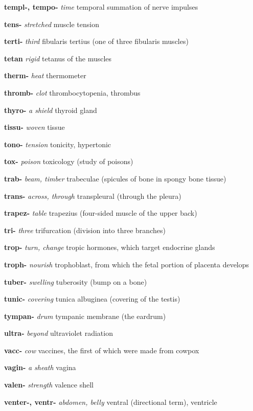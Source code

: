 \documentclass[10pt]{article}
\begin{document}
\begin{multicols}{2}
\begin{hangparas}{10pt}{1}
 \textbf{templ-, tempo-} \textit{time} temporal summation of nerve impulses \par
 \textbf{tens-} \textit{stretched} muscle tension \par
 \textbf{terti-} \textit{third} fibularis tertius (one of three fibularis muscles) \par
 \textbf{tetan} \textit{rigid} tetanus of the muscles \par
 \textbf{therm-} \textit{heat} thermometer \par
 \textbf{thromb-} \textit{clot} thrombocytopenia, thrombus \par
 \textbf{thyro-} \textit{a shield} thyroid gland \par
 \textbf{tissu-} \textit{woven} tissue \par
 \textbf{tono-} \textit{tension} tonicity, hypertonic \par
 \textbf{tox-} \textit{poison} toxicology (study of poisons) \par
 \textbf{trab-} \textit{beam, timber} trabeculae (spicules of bone in spongy bone tissue) \par
 \textbf{trans-} \textit{across, through} transpleural (through the pleura) \par
 \textbf{trapez-} \textit{table} trapezius (four-sided muscle of the upper back) \par
 \textbf{tri-} \textit{three} trifurcation (division into three branches) \par
 \textbf{trop-} \textit{turn, change} tropic hormones, which target endocrine glands \par
 \textbf{troph-} \textit{nourish} trophoblast, from which the fetal portion of placenta develops \par
 \textbf{tuber-} \textit{swelling} tuberosity (bump on a bone) \par
 \textbf{tunic-} \textit{covering} tunica albuginea (covering of the testis) \par
 \textbf{tympan-} \textit{drum} tympanic membrane (the eardrum) \par
 \textbf{ultra-} \textit{beyond} ultraviolet radiation \par
 \textbf{vacc-} \textit{cow} vaccines, the first of which were made from cowpox \par
 \textbf{vagin-} \textit{a sheath} vagina \par
 \textbf{valen-} \textit{strength} valence shell \par
 \textbf{venter-, ventr-} \textit{abdomen, belly} ventral (directional term), ventricle \par

\end{hangparas}
\end{multicols}
\end{document}
